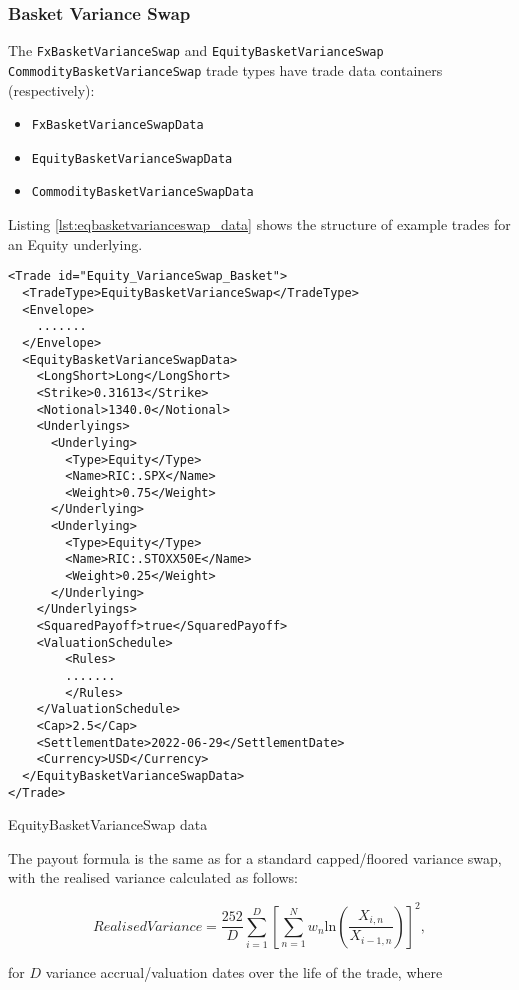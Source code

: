 \subsubsection*{Basket Variance Swap}

The \lstinline!FxBasketVarianceSwap! and \lstinline!EquityBasketVarianceSwap! \lstinline!CommodityBasketVarianceSwap! trade types
have trade data containers (respectively):
\begin{itemize}
  \item \lstinline!FxBasketVarianceSwapData!
  \item \lstinline!EquityBasketVarianceSwapData!
  \item \lstinline!CommodityBasketVarianceSwapData!
\end{itemize}
Listing \ref{lst:eqbasketvarianceswap_data} shows the structure of example trades for an Equity underlying.

\begin{listing}[H]
\begin{verbatim}
<Trade id="Equity_VarianceSwap_Basket">
  <TradeType>EquityBasketVarianceSwap</TradeType>
  <Envelope>
    .......
  </Envelope>
  <EquityBasketVarianceSwapData>
    <LongShort>Long</LongShort>
    <Strike>0.31613</Strike>
    <Notional>1340.0</Notional>
    <Underlyings>
      <Underlying>
        <Type>Equity</Type>
        <Name>RIC:.SPX</Name>
        <Weight>0.75</Weight>
      </Underlying>
      <Underlying>
        <Type>Equity</Type>
        <Name>RIC:.STOXX50E</Name>
        <Weight>0.25</Weight>
      </Underlying>
    </Underlyings>
    <SquaredPayoff>true</SquaredPayoff>
    <ValuationSchedule>
        <Rules>
        .......
        </Rules>
    </ValuationSchedule>
    <Cap>2.5</Cap>
    <SettlementDate>2022-06-29</SettlementDate>
    <Currency>USD</Currency>
  </EquityBasketVarianceSwapData>
</Trade>
\end{verbatim}
\caption{EquityBasketVarianceSwap data}
\label{lst:eqbasketvarianceswap_data}
\end{listing}

The payout formula is the same as for a standard capped/floored variance swap, with the
realised variance calculated as follows:

\begin{equation*}
  Realised Variance = \frac{252}{D} \sum_{i=1}^D \left[\sum_{n=1}^N w_n \text{ln}\left(\frac{X_{i,n}}{X_{i-1,n}}\right) \right]^2,
\end{equation*}

for $D$ variance accrual/valuation dates over the life of the trade, where

